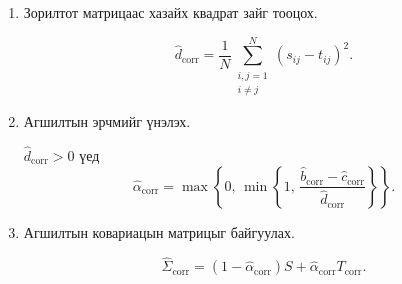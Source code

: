 \begin{enumerate}
	\item Зорилтот матрицаас хазайх
	квадрат зайг тооцох.
	
	\[
	\widehat d_{\mathrm{corr}}
	=
	\frac{1}{N}
	\sum_{\substack{i,j=1\\i\neq j}}^{N}
	(s_{ij}-t_{ij})^2.
	\]
	
	\item Агшилтын эрчмийг үнэлэх.
	
	$\widehat d_{\mathrm{corr}}>0$
	үед
	\[
	\widehat{\alpha}_{\mathrm{corr}}
	=
	\max\left\{
	0,\,
	\min\left\{
	1,\,
	\frac{
		\widehat b_{\mathrm{corr}}
		-
		\widehat c_{\mathrm{corr}}
	}{
		\widehat d_{\mathrm{corr}}
	}
	\right\}
	\right\}.
	\]
	
	\item Агшилтын ковариацын
	матрицыг байгуулах.
	
	\[
	\widehat{\Sigma}_{\mathrm{corr}}
	=
	(1-\widehat{\alpha}_{\mathrm{corr}})S
	+
	\widehat{\alpha}_{\mathrm{corr}}
	T_{\mathrm{corr}}.
	\]
\end{enumerate}
